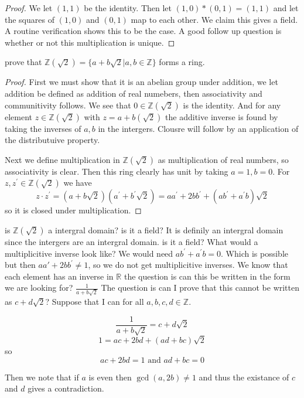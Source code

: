 \documentclass[11pt,largemargins]{homework}
\newcommand{\R}{\mathbb{R}}
\newcommand{\Z}{\mathbb{Z}}
\begin{document}
\begin{proof}
    We let $(1, 1)$ be the identity. Then let $(1, 0) * (0, 1) = (1,1)$ and 
    let the squares of $(1, 0)$ and $(0, 1)$ map to each other. We claim this gives a field. 
    A routine verification shows this to be the case. A good follow up question is 
    whether or not this multiplication is unique. 
\end{proof}

\question 
prove that $\Z(\sqrt{2}) = \{a + b\sqrt{2} | a, b \in \Z \} $ forms a ring. 

\begin{proof}
    First we must show that it is an abelian group under addition, we let addition be defined as addition of 
    real numebers, then associativity and communitivity follows. We see that $0 \in \Z(\sqrt{2})$ is the identity. And for any element 
    $z \in \Z(\sqrt{2})$ with $z = a + b(\sqrt{2})$ the additive inverse is found by taking the inverses of $a, b$ in 
    the intergers. Clousre will follow by an application of the distributuive property. 

    Next we define multiplication in $\Z(\sqrt{2}) $ as multiplication of real numbers, so associativity is clear. Then this ring clearly has unit by 
    taking $a = 1, b = 0$. For $z, z^\prime \in \Z(\sqrt{2})$ we have 
    \[ z \cdot z^\prime = (a + b \sqrt{2})(a^\prime + b^\prime \sqrt{2}) = a a^\prime + 2b b^\prime + (a b^\prime + a^\prime b) \sqrt{2}\]
    so it is closed under multiplication. 
\end{proof}

is $\Z(\sqrt{2})$ a intergral domain? is it a field? It is definily an intergral domain since the intergers are an intergral domain.
is it a field? What would a multiplicitive inverse look like? We would need $ab^\prime + a^\prime b = 0$. Which is possible but then 
$a a\prime + 2 b b^\prime \neq 1$, so we do not get multiplicitive inverses. We know that each element has an inverse in $\R$ the question is can 
this be written in the form we are looking for? $\frac{1}{a + b\sqrt{2}} $ The question is can I prove that this cannot be written as 
$c + d\sqrt{2}$? Suppose that I can for all $a, b , c, d \in \Z$. 

\[\frac{1}{a + b \sqrt{2}} = c + d \sqrt{2} \]
\[1 = ac + 2bd + (ad + bc) \sqrt{2} \] 
so 
\[ac + 2bd = 1 \text{ and } ad + bc = 0\]

Then we note that if $a$ is even then $\gcd(a, 2b) \neq 1$ and thus the existance of $c$ and $d$ gives a contradiction. 
\end{document}
